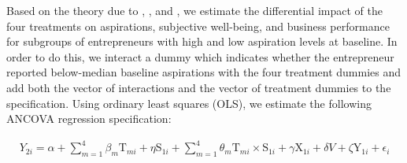 \documentclass[11.5pt]{article}
\begin{document}


Based on the theory due to \citet{Ray2006}, \citet{Genicot2017}, and \citet{Dalton2016}, we estimate the differential impact of the four treatments on aspirations, subjective well-being, and business performance for subgroups of entrepreneurs with high and low aspiration levels at baseline. In order to do this, we interact a dummy which indicates whether the entrepreneur reported below-median baseline aspirations with the four treatment dummies and add both the vector of interactions and the vector of treatment dummies to the specification. Using ordinary least squares (OLS), we estimate the following ANCOVA regression specification:

\begin{align}
    {Y}_{2i} = \alpha + \sum\limits_{m=1}^4 \beta_m \text{T}_{mi} + \eta \text{S}_{1i} + \sum\limits_{m=1}^4 \theta_m \text{T}_{mi} \times \text{S}_{1i} + \gamma \text{X}_{1i} + \delta {V} + \zeta \text{Y}_{1i} + \epsilon_i \label{eq:2}
\end{align}
\end{document}
